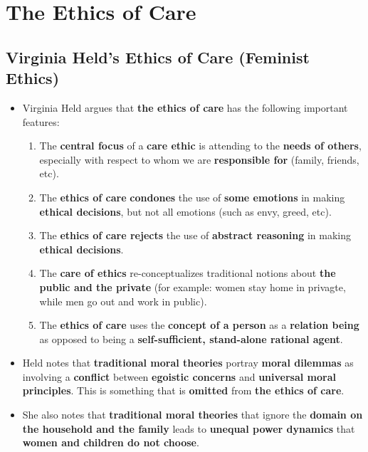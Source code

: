 \documentclass[16pt]{article}
\begin{document}
    \section*{The Ethics of Care}

    \subsection*{Virginia Held's Ethics of Care (Feminist Ethics)}
    \begin{itemize}
        \item Virginia Held argues that \textbf{the ethics of care} has the following important features:
        \begin{enumerate}
            \item The \textbf{central focus} of a \textbf{care ethic} is attending to the \textbf{needs of others}, especially with respect to whom we are \textbf{responsible for} (family, friends, etc).
            \item The \textbf{ethics of care} \textbf{condones} the use of \textbf{some emotions} in making \textbf{ethical decisions}, but not all emotions (such as envy, greed, etc).
            \item The \textbf{ethics of care rejects} the use of \textbf{abstract reasoning} in making \textbf{ethical decisions}.
            \item The \textbf{care of ethics} re-conceptualizes traditional notions about \textbf{the public and the private} (for example: women stay home in privagte, while men go out and work in public).
            \item The \textbf{ethics of care} uses the \textbf{concept of a person} as a \textbf{relation being} as opposed to being a \textbf{self-sufficient, stand-alone rational agent}.
        \end{enumerate}
        \item Held notes that \textbf{traditional moral theories} portray \textbf{moral dilemmas} as involving a \textbf{conflict} between \textbf{egoistic concerns} and \textbf{universal moral principles}. This is something that is \textbf{omitted} from \textbf{the ethics of care}.
        \item She also notes that \textbf{traditional moral theories} that ignore the \textbf{domain on the household and the family} leads to \textbf{unequal power dynamics} that \textbf{women and children do not choose}.
    \end{itemize}
\end{document}
